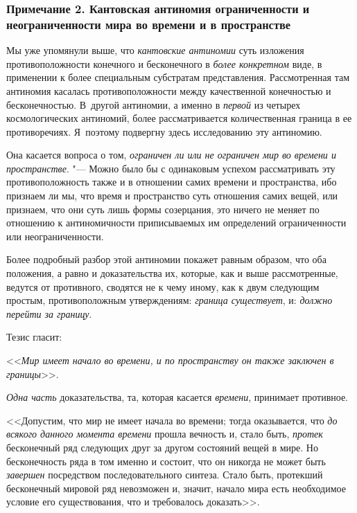 \subsubsection[Примечание 2. Кантовская антиномия ограниченности и неограниченности мира во времени и в пространстве]
{Примечание 2. Кантовская антиномия ограниченности и неограниченности мира во времени и в пространстве}

Мы уже упомянули выше, что {\em кантовские антиномии}
суть изложения противоположности конечного и бесконечного в
{\em более конкретном} виде, в применении к более
специальным субстратам представления. Рассмотренная там антиномия касалась
противоположности между качественной конечностью и бесконечностью. В~другой
антиномии, а именно в {\em первой} из четырех
космологических антиномий, более рассматривается количественная граница в
ее противоречиях. Я~поэтому подвергну здесь исследованию эту антиномию.

Она касается вопроса о том, {\em ограничен ли или не
ограничен мир во времени и пространстве}. "--- Можно было бы с одинаковым
успехом рассматривать эту противоположность также и в отношении самих
времени и пространства, ибо признаем ли мы, что время и пространство суть
отношения самих вещей, или признаем, что они суть лишь формы созерцания,
это ничего не меняет по отношению к антиномичности приписываемых им
определений ограниченности или неограниченности.

Более подробный разбор этой антиномии покажет равным образом, что оба
положения, а равно и доказательства их, которые, как и выше рассмотренные,
ведутся от противного, сводятся не к чему иному, как к двум следующим
простым, противоположным утверждениям: {\em граница
существует}, и: {\em должно перейти за границу}.

Тезис гласит:

<<{\em Мир имеет начало во времени, и по пространству он
также заключен в границы}>>.

{\em Одна часть} доказательства, та, которая касается
{\em времени}, принимает противное.

<<Допустим, что мир не имеет начала во времени; тогда оказывается, что
{\em до всякого данного момента времени} прошла
вечность и, стало быть, {\em протек} бесконечный ряд
следующих друг за другом состояний вещей в мире. Но бесконечность ряда в
том именно и состоит, что он никогда не может быть
{\em завершен} посредством последовательного синтеза.
Стало быть, протекший бесконечный мировой ряд невозможен и, значит, начало
мира есть необходимое условие его существования, что и требовалось
доказать>>.

